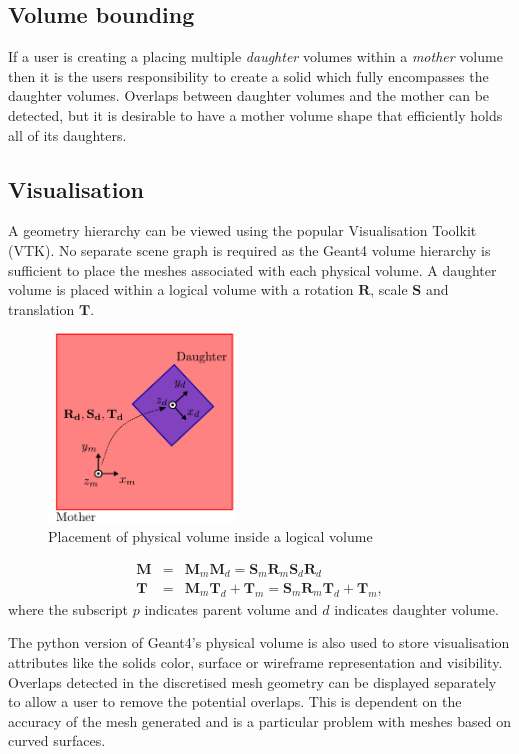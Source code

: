 \documentclass[final,5p,times,twocolumn]{elsarticle}
\begin{document}
\subsection{Volume bounding} 
If a user is creating a placing multiple {\em daughter} volumes within a {\em mother} volume then it is the users responsibility to create a solid which fully encompasses the 
daughter volumes. Overlaps between daughter volumes and the mother can be detected, but it is desirable to have a mother volume shape that efficiently holds all of its daughters. 
 
\subsection{Visualisation}
A  geometry hierarchy can be viewed using the popular Visualisation Toolkit (VTK). No separate scene graph is required as the Geant4 volume hierarchy is sufficient 
to place the meshes associated with each physical volume. A daughter volume is placed within a logical volume with a rotation $\mathbf{R}$, scale $\mathbf{S}$ and 
translation $\mathbf{T}$.

\begin{figure}[htbp]
\begin{center}
\includegraphics[width=5cm]{./diagrams/lvToPv.pdf}
\caption{Placement of physical volume inside a logical volume}
\label{fig:lvToPv}
\end{center}
\end{figure} 

\begin{eqnarray}
\mathbf{M}	  	& = & \mathbf{M}_m \mathbf{M}_d  = \mathbf{S}_m \mathbf{R}_m  \mathbf{S}_d \mathbf{R}_d\\
\mathbf{T}	 		& = & \mathbf{M}_m \mathbf{T}_d + \mathbf{T}_m= \mathbf{S}_m \mathbf{R}_m \mathbf{T}_d + \mathbf{T}_m,
\end{eqnarray}
where the subscript $p$ indicates parent volume and $d$ indicates daughter volume.

The python version of Geant4's physical volume is also used to store visualisation attributes like the solids 
color, surface or wireframe representation and visibility. Overlaps detected in the discretised mesh geometry can be displayed separately to allow a user to remove
the potential overlaps. This is dependent on the accuracy of the mesh generated and is a particular problem with meshes based on curved surfaces.    
\end{document}
